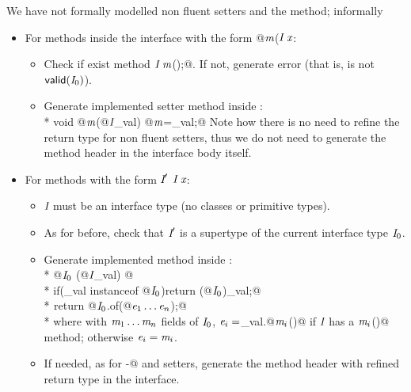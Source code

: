 We have not formally modelled non fluent setters and the \Q@with@ method; informally
\begin{itemize}
\item For methods inside the interface with the form \Q@void @$\textit{m}$\QM($\C\ \x$\QM{);}:
  \begin{itemize}
    \item Check if exist method $\C\ \m$\Q@();@. If not, generate error (that is, is not $\textsf{valid}(\textit{I}_0)$).
    \item Generate implemented setter method inside \Q@of@:\\*
           \Q@public void @$\textit{m}$\Q@(@$\textit{I}$\Q@ _val) { @$\textit{m}$\Q@=_val;}@
    Note how there is no need to refine the return type for non fluent setters, thus we do not need to generate the method header in the interface body itself.
    \end{itemize}
\item For methods with the form $\C'\ $$\C\ \x$\QM{);}:
  \begin{itemize}
   \item $\textit{I}$ must be an interface type (no classes or primitive types).
    \item As for before, check that $\textit{I}'$ is a supertype of the current interface type $\textit{I}_0$.
    \item Generate implemented \Q@with@ method inside \Q@of@:\\*
           \Q@public @$\textit{I}_0\ $\Q@with(@$\textit{I}$\Q@ _val) { @\\*
           \Q@  if(_val instanceof @$\textit{I}_0$\Q@){return (@$\textit{I}_0$\Q@)_val;}@\\*
${}_{}$\Q@  return @$\textit{I}_0$\Q@.of(@$\textit{e}_1\ldots\textit{e}_n$\Q@);}@\\*
where with $\textit{m}_1\ldots\textit{m}_n$  fields of $\textit{I}_0$,
$\textit{e}_i=$\Q@_val.@$\textit{m}_i$\Q@()@ if $\textit{I}$ has a $\textit{m}_i$\Q@()@ method; otherwise
$\textit{e}_i=\textit{m}_i$.
    \item If needed, as for \Q@with-@ and setters, generate the method header with refined return type in the interface.
 \end{itemize}

\end{itemize}



